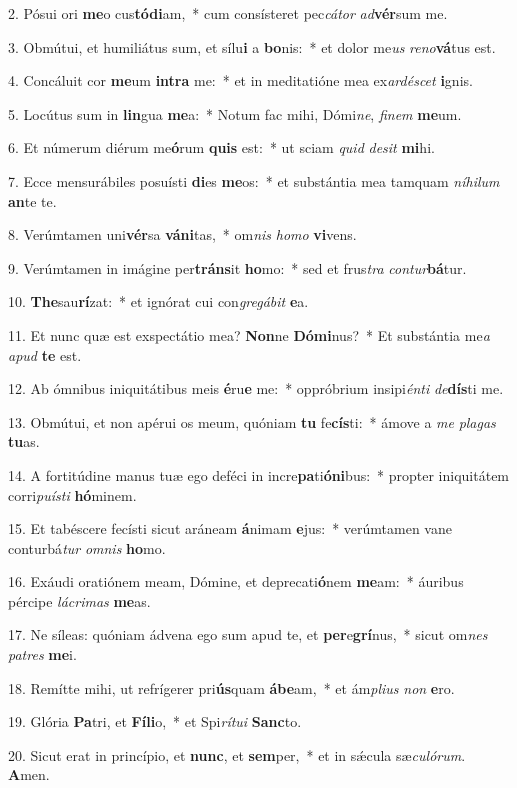 2. Pósui ori \textbf{me}o cus\textbf{tó}\textbf{di}am,~*  cum consísteret pec\textit{cá}\textit{tor} \textit{ad}\textbf{vér}sum me.\

3. Obmútui, et humiliátus sum, et sílu\textbf{i} a \textbf{bo}nis:~*  et dolor me\textit{us} \textit{re}\textit{no}\textbf{vá}tus est.\

4. Concáluit cor \textbf{me}um \textbf{in}\textbf{tra} me:~*  et in meditatióne mea ex\textit{ar}\textit{dé}\textit{scet} \textbf{i}gnis.\

5. Locútus sum in \textbf{lin}gua \textbf{me}a:~*  Notum fac mihi, Dómi\textit{ne}, \textit{fi}\textit{nem} \textbf{me}um.\

6. Et númerum diérum me\textbf{ó}rum \textbf{quis} est:~*  ut sciam \textit{quid} \textit{de}\textit{sit} \textbf{mi}hi.\

7. Ecce mensurábiles posuísti \textbf{di}es \textbf{me}os:~*  et substántia mea tamquam \textit{ní}\textit{hi}\textit{lum} \textbf{an}te te.\

8. Verúmtamen uni\textbf{vér}sa \textbf{vá}\textbf{ni}tas,~*  om\textit{nis} \textit{ho}\textit{mo} \textbf{vi}vens.\

9. Verúmtamen in imágine per\textbf{tráns}it \textbf{ho}mo:~*  sed et frus\textit{tra} \textit{con}\textit{tur}\textbf{bá}tur.\

10. \textbf{The}sau\textbf{rí}zat:~*  et ignórat cui con\textit{gre}\textit{gá}\textit{bit} \textbf{e}a.\

11. Et nunc quæ est exspectátio mea? \textbf{Non}ne \textbf{Dó}\textbf{mi}nus?~*  Et substántia me\textit{a} \textit{a}\textit{pud} \textbf{te} est.\

12. Ab ómnibus iniquitátibus meis \textbf{é}ru\textbf{e} me:~*  oppróbrium insipi\textit{én}\textit{ti} \textit{de}\textbf{dís}ti me.\

13. Obmútui, et non apérui os meum, quóniam \textbf{tu} fe\textbf{cís}ti:~*  ámove a \textit{me} \textit{pla}\textit{gas} \textbf{tu}as.\

14. A fortitúdine manus tuæ ego deféci in incre\textbf{pa}ti\textbf{ó}\textbf{ni}bus:~*  propter iniquitátem corri\textit{pu}\textit{ís}\textit{ti} \textbf{hó}minem.\

15. Et tabéscere fecísti sicut aráneam \textbf{á}nimam \textbf{e}jus:~*  verúmtamen vane conturbá\textit{tur} \textit{om}\textit{nis} \textbf{ho}mo.\

16. Exáudi oratiónem meam, Dómine, et deprecati\textbf{ó}nem \textbf{me}am:~*  áuribus pércipe \textit{lá}\textit{cri}\textit{mas} \textbf{me}as.\

17. Ne síleas: quóniam ádvena ego sum apud te, et \textbf{per}e\textbf{grí}nus,~*  sicut om\textit{nes} \textit{pa}\textit{tres} \textbf{me}i.\

18. Remítte mihi, ut refrígerer pri\textbf{ús}quam \textbf{á}\textbf{be}am,~*  et ám\textit{pli}\textit{us} \textit{non} \textbf{e}ro.\

19. Glória \textbf{Pa}tri, et \textbf{Fí}\textbf{li}o,~*  et Spi\textit{rí}\textit{tu}\textit{i} \textbf{Sanc}to.\

20. Sicut erat in princípio, et \textbf{nunc}, et \textbf{sem}per,~*  et in sǽcula sæ\textit{cu}\textit{ló}\textit{rum}. \textbf{A}men.\

